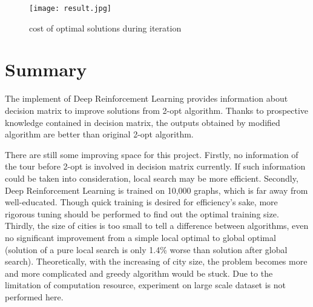 \documentclass[twocolumn]{article}
\begin{document}
\begin{figure}[tbph]
    \centering
    \texttt{[image: result.jpg]}
    \caption{cost of optimal solutions during iteration}
    \label{fig:result}
\end{figure}

\section{Summary}
The implement of Deep Reinforcement Learning provides information about decision matrix to improve solutions from 2-opt algorithm. Thanks to prospective knowledge contained in decision matrix, the outputs obtained by modified algorithm are better than original 2-opt algorithm. 

There are still some improving space for this project. Firstly, no information of the tour before 2-opt is involved in decision matrix currently. If such information could be taken into consideration, local search may be more efficient. Secondly, Deep Reinforcement Learning is trained on 10,000 graphs, which is far away from well-educated. Though quick training is desired for efficiency's sake, more rigorous tuning should be performed to find out the optimal training size. Thirdly, the size of cities is too small to tell a difference between algorithms, even no significant improvement from a simple local optimal to global optimal (solution of a pure local search is only 1.4\% worse than solution after global search). Theoretically, with the increasing of city size, the problem becomes more and more complicated and greedy algorithm would be stuck. Due to the limitation of computation resource, experiment on large scale dataset is not performed here.
\newpage
\printbibliography
\end{document}

